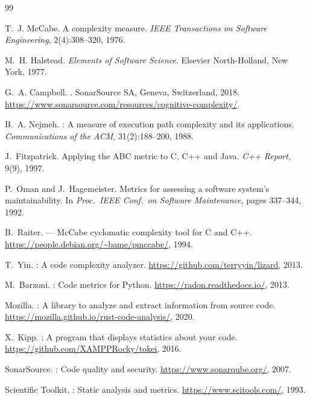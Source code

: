 \documentclass[10pt,twocolumn,letterpaper]{article}
\begin{document}
\begin{thebibliography}{99}

T.~J. McCabe.
\newblock A complexity measure.
\newblock \emph{IEEE Transactions on Software Engineering}, 2(4):308--320,
  1976.

M.~H. Halstead.
\newblock \emph{Elements of Software Science}.
\newblock Elsevier North-Holland, New York, 1977.

G.~A. Campbell.
.
\newblock SonarSource SA, Geneva, Switzerland, 2018.
\newblock \url{https://www.sonarsource.com/resources/cognitive-complexity/}.

B.~A. Nejmeh.
: A measure of execution path complexity and its applications.
\newblock \emph{Communications of the ACM}, 31(2):188--200, 1988.

J.~Fitzpatrick.
\newblock Applying the {ABC} metric to {C}, {C++} and {Java}.
\newblock \emph{C++ Report}, 9(9), 1997.

P.~Oman and J.~Hagemeister.
\newblock Metrics for assessing a software system's maintainability.
\newblock In \emph{Proc.\ IEEE Conf.\ on Software Maintenance}, pages
  337--344, 1992.

B.~Raiter.
 --- McCabe cyclomatic complexity tool for C and C++.
\newblock \url{https://people.debian.org/~bame/pmccabe/}, 1994.

T.~Yin.
: A code complexity analyzer.
\newblock \url{https://github.com/terryyin/lizard}, 2013.

M.~Barzoni.
: Code metrics for Python.
\newblock \url{https://radon.readthedocs.io/}, 2013.

{Mozilla}.
: A library to analyze and extract information
  from source code.
\newblock \url{https://mozilla.github.io/rust-code-analysis/}, 2020.

X.~Kipp.
: A program that displays statistics about your code.
\newblock \url{https://github.com/XAMPPRocky/tokei}, 2016.

{SonarSource}.
: Code quality and security.
\newblock \url{https://www.sonarqube.org/}, 2007.

{Scientific Toolkit}.
: Static analysis and metrics.
\newblock \url{https://www.scitools.com/}, 1993.


\end{thebibliography}
\end{document}
